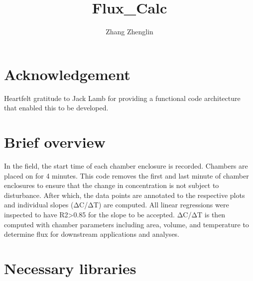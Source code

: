 \documentclass[
]{article}
\title{Flux\_Calc}
\author{Zhang Zhenglin}
\date{}
\begin{document}
\maketitle

{
\setcounter{tocdepth}{2}
\tableofcontents
}
\section{Acknowledgement}\label{acknowledgement}

Heartfelt gratitude to Jack Lamb for providing a functional code
architecture that enabled this to be developed.

\section{Brief overview}\label{brief-overview}

In the field, the start time of each chamber enclosure is recorded.
Chambers are placed on for 4 minutes. This code removes the first and
last minute of chamber enclosures to ensure that the change in
concentration is not subject to disturbance. After which, the data
points are annotated to the respective plots and individual slopes
(ΔC/ΔT) are computed. All linear regressions were inspected to have
R2\textgreater0.85 for the slope to be accepted. ΔC/ΔT is then computed
with chamber parameters including area, volume, and temperature to
determine flux for downstream applications and analyses.

\section{Necessary libraries}\label{necessary-libraries}
\end{document}
